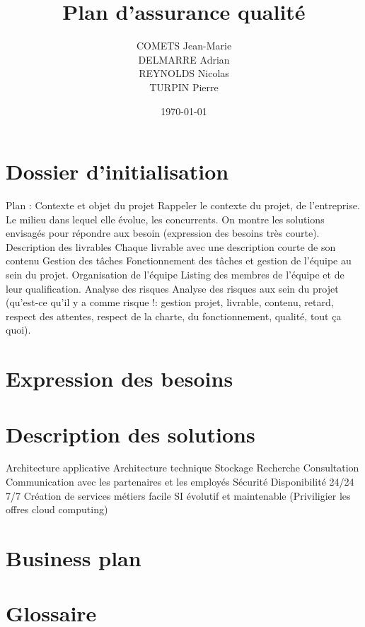 \documentclass[11pt, a4paper]{article}
\begin{document}
\title{Plan d'assurance qualité}
\author{
  COMETS Jean-Marie \\
  DELMARRE Adrian \\
  REYNOLDS Nicolas \\
  TURPIN Pierre
}
\date{\today}

\maketitle \newpage


\section{Dossier d'initialisation}
Plan :
  Contexte et objet du projet
    Rappeler le contexte du projet, de l'entreprise. Le milieu dans lequel elle
    évolue, les concurrents.
    On montre les solutions envisagés pour répondre aux besoin (expression des
    besoins très courte).
  Description des livrables
    Chaque livrable avec une description courte de son contenu
  Gestion des tâches
    Fonctionnement des tâches et gestion de l'équipe au sein du projet.
  Organisation de l'équipe
    Listing des membres de l'équipe et de leur qualification.
  Analyse des risques
    Analyse des risques aux sein du projet (qu'est-ce qu'il y a comme risque !:
    gestion projet, livrable, contenu, retard, respect des attentes, respect de
    la charte, du fonctionnement, qualité, tout ça quoi).

\section{Expression des besoins}

\section{Description des solutions}
Architecture applicative
Architecture technique
  Stockage
  Recherche
  Consultation
  Communication avec les partenaires et les employés
  Sécurité
  Disponibilité 24/24 7/7
  Création de services métiers facile
  SI évolutif et maintenable
  (Priviligier les offres cloud computing)

\section{Business plan}

\section{Glossaire}
\end{document}
